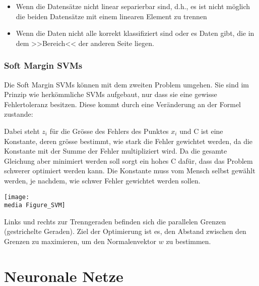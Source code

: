 \begin{itemize}
	\item Wenn die Datensätze nicht linear separierbar sind, d.h., es ist nicht möglich die beiden Datensätze mit einem linearen Element zu trennen\\
	
	\item Wenn die Daten nicht alle korrekt klassifiziert sind oder es Daten gibt, die in dem >>Bereich<< der anderen Seite liegen.
\end{itemize}

\subsubsection{Soft Margin SVMs}
Die Soft Margin SVMs können mit dem zweiten Problem umgehen.
Sie sind im Prinzip wie herkömmliche SVMs aufgebaut, nur dass sie eine gewisse Fehlertoleranz besitzen. Diese kommt durch eine Veränderung an der Formel zustande:


Dabei steht $z_{i}$ für die Grösse des Fehlers des Punktes $x_{i}$ und C ist eine Konstante, deren grösse bestimmt, wie stark die Fehler gewichtet werden, da die Konstante mit der Summe der Fehler multipliziert wird. Da die gesamte Gleichung aber minimiert werden soll sorgt ein hohes C dafür, dass das Problem schwerer optimiert werden kann. Die Konstante muss vom Mensch selbst gewählt werden, je nachdem, wie schwer Fehler gewichtet werden sollen.

\begin{dsafigure}
	\begin{center}
		\texttt{[image: \\media Figure\_SVM]}
		\caption{Links und rechts zur Trenngeraden befinden sich die parallelen Grenzen (gestrichelte Geraden). Ziel der Optimierung ist es, den Abstand zwischen den Grenzen zu maximieren, um den Normalenvektor $w$ zu bestimmen.}
		\label{FigSVM}
	\end{center}
\end{dsafigure}

\section{Neuronale Netze}

